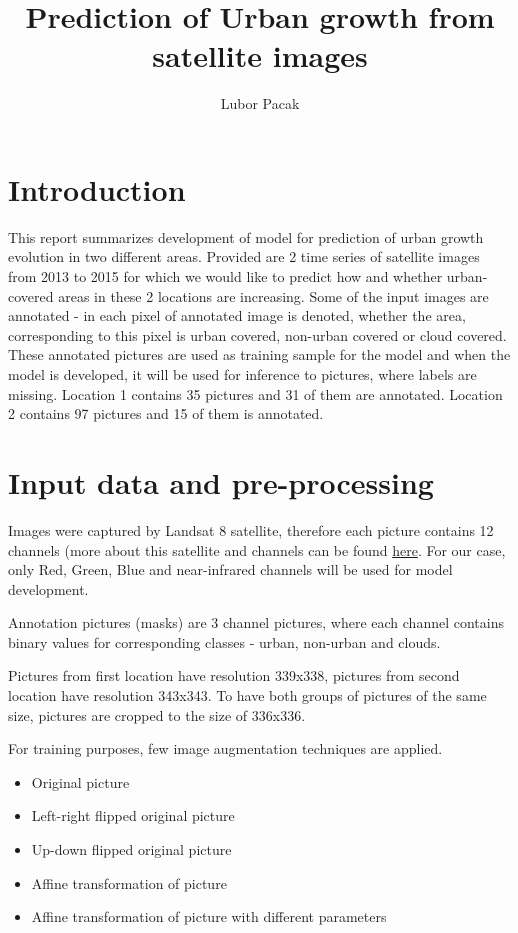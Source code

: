 \documentclass{homework}
\title{Prediction of Urban growth from satellite images}
\author{Lubor Pacak}
\begin{document}
\maketitle

\section{Introduction}

This report summarizes development of model for prediction of urban growth evolution in two different areas.
Provided are 2 time series of satellite images from 2013 to 2015 for which we would like to predict how and whether urban-covered areas in these 2 locations are increasing. Some of the input images are annotated - in each pixel of annotated image is denoted, whether the area, corresponding to this pixel is urban covered, non-urban covered or cloud covered.
These annotated pictures are used as training sample for the model and when the model is developed, it will be used for inference to pictures, where labels are missing. Location 1 contains 35 pictures and 31 of them are annotated. Location 2 contains 97 pictures and 15 of them is annotated.


\section{Input data and pre-processing}

Images were captured by Landsat 8 satellite, therefore each picture contains 12 channels (more about this satellite and channels can be found
\href{https://en.wikipedia.org/wiki/Landsat_8}{here}.
For our case, only Red, Green, Blue and near-infrared channels will be used for model development.

Annotation pictures (masks) are 3 channel pictures, where each channel contains binary values for corresponding classes - urban, non-urban and clouds.

Pictures from first location have resolution 339x338, pictures from second location have resolution 343x343. To have both groups of pictures of the same size, pictures are cropped to the size of 336x336.

For training purposes, few image augmentation techniques are applied. 

\begin{itemize}
    \item Original picture
    \item Left-right flipped original picture
    \item Up-down flipped original picture
    \item Affine transformation of picture
    \item Affine transformation of picture with different parameters
    
\end{itemize}
\end{document}
